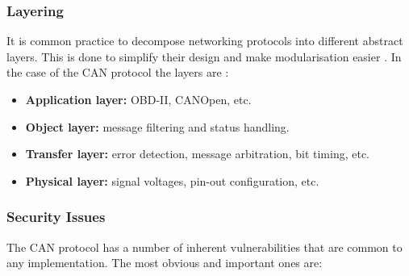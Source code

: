 \subsubsection{Layering}
\label{subsec:can:layering}

It is common practice to decompose networking protocols into different abstract layers. This is done to simplify their design and make modularisation easier \cite{wiki:ProtocolStack}. In the case of the CAN protocol the layers are \cite{ISO11898-2,ISO11898-3}:

\begin{itemize}
	\item \textbf{Application layer:} OBD-II, CANOpen, etc.
	\item \textbf{Object layer:} message filtering and status handling.
	\item \textbf{Transfer layer:} error detection, message arbitration, bit timing, etc.
	\item \textbf{Physical layer:} signal voltages, pin-out configuration, etc.
\end{itemize}

\subsubsection{Security Issues}
\label{subsec:can:security_issues}

The CAN protocol has a number of inherent vulnerabilities that are common to any implementation. The most obvious and important ones are:

